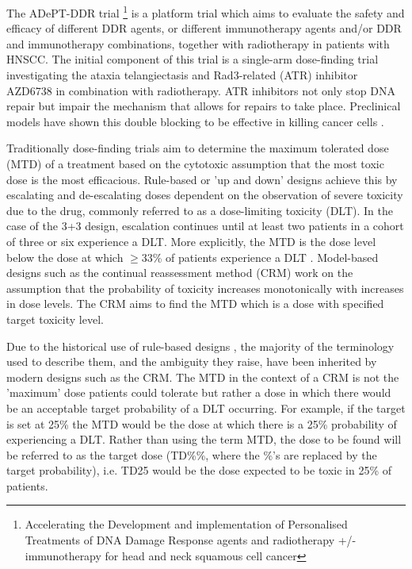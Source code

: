 The ADePT-DDR trial \footnote{Accelerating the Development and implementation of Personalised Treatments of DNA Damage Response agents and radiotherapy +/- immunotherapy for head and neck squamous cell cancer } is a platform trial which aims to evaluate the safety and efficacy of different DDR agents, or different immunotherapy agents and/or DDR and immunotherapy combinations, together with radiotherapy in patients with HNSCC. The initial component of this trial is a single-arm dose-finding trial investigating the ataxia telangiectasis and Rad3-related (ATR) inhibitor AZD6738 in combination with radiotherapy. ATR inhibitors not only stop DNA repair but impair the mechanism that allows for repairs to take place. Preclinical models have shown this double blocking to be effective in killing cancer cells \cite{meiAtaxiaTelangiectasiaRad3related2019}. 

Traditionally dose-finding trials aim to determine the maximum tolerated dose (MTD) of a treatment based on the cytotoxic assumption that the most toxic dose is the most efficacious. Rule-based or 'up and down' designs achieve this by escalating and de-escalating doses dependent on the observation of severe toxicity due to the drug,  commonly referred to as a dose-limiting toxicity (DLT). In the case of the 3+3 design, escalation continues until at least two patients in a cohort of three or six experience a DLT. More explicitly, the MTD is the dose level below the dose at which $\geq$33\% of patients experience a DLT \cite{letourneauDoseEscalationMethods2009}. Model-based designs such as the continual reassessment method (CRM) \cite{oquigleyContinualReassessmentMethod1990} work on the assumption that the probability of toxicity increases monotonically with increases in dose levels. The CRM aims to find the MTD which is a dose with specified target toxicity level. 

Due to the historical use of rule-based designs  \cite{rogatkoTranslationInnovativeDesigns2007, chiuzanDosefindingDesignsTrials2017}, the majority of the terminology used to describe them, and the ambiguity they raise, have been inherited by modern designs such as the CRM. The MTD in the context of a CRM is not the 'maximum' dose patients could tolerate but rather a dose in which there would be an acceptable target probability of a DLT occurring. For example, if the target is set at 25\% the MTD would be the dose at which there is a 25\% probability of experiencing a DLT. Rather than using the term MTD, the dose to be found will be referred to as the target dose (TD\%\%, where the \%'s are replaced by the target probability), i.e. TD25 would be the dose expected to be toxic in 25\% of patients.

